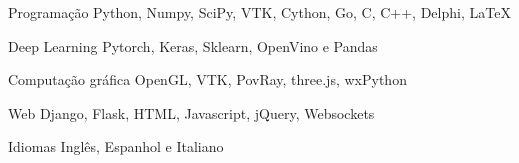 \begin{cvskills}

  \cvskill
  {Programação} %
  {Python, Numpy, SciPy, VTK, Cython, Go, C, C++, Delphi, LaTeX} %

  \cvskill
  {Deep Learning} %
  {Pytorch, Keras, Sklearn, OpenVino e Pandas} %

  \cvskill
  {Computação gráfica}
  {OpenGL, VTK, PovRay, three.js, wxPython}

  \cvskill
  {Web} %
  {Django, Flask, HTML, Javascript, jQuery, Websockets} %

  \cvskill
  {Idiomas} %
  {Inglês, Espanhol e Italiano} %

\end{cvskills}
